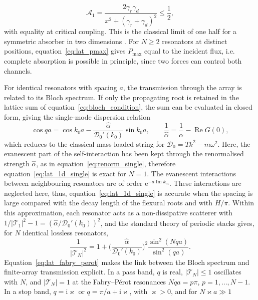 \begin{equation}\label{eq:lat_absorbed_1d}
    \mathcal{A}_1=\frac{2\gamma_r\gamma_d}{x^2+(\gamma_r+\gamma_d)^2}\le\frac12,
\end{equation}
with equality at critical coupling. This is the classical limit of one half for a symmetric absorber in two dimensions \citep{evans1976theory}. For $N\ge2$ resonators at distinct positions, equation~\eqref{eq:lat_pmax} gives $P_{\max}$ equal to the incident flux, i.e. complete absorption is possible in principle, since two forces can control both channels.

For identical resonators with spacing $a$, the transmission through the array is related to its Bloch spectrum. If only the propagating root is retained in the lattice sum of equation~\eqref{eq:bloch_condition}, the sum can be evaluated in closed form, giving the single-mode dispersion relation
\begin{equation}\label{eq:lat_1d_single}
    \cos qa=\cos k_0a-\frac{\widehat{\alpha}}{\mathcal{D}_0'(k_0)}\sin k_0a,
    \qquad
    \frac{1}{\widehat{\alpha}}=\frac{1}{\alpha}-\operatorname{Re}G(0),
\end{equation}
which reduces to the classical mass-loaded string for $\mathcal{D}_0=Tk^2-m\omega^2$. Here, the evanescent part of the self-interaction has been kept through the renormalised strength $\widehat{\alpha}$, as in equation~\eqref{eq:renorm_single}, therefore equation~\eqref{eq:lat_1d_single} is exact for $N=1$. The evanescent interactions between neighbouring resonators are of order $\mathrm{e}^{-a\operatorname{Im}k_m}$. These interactions are neglected here, thus, equation~\eqref{eq:lat_1d_single} is accurate when the spacing is large compared with the decay length of the flexural roots and with $H/\pi$. Within this approximation, each resonator acts as a non-dissipative scatterer with $1/|\mathcal{T}_1|^2-1=(\widehat{\alpha}/\mathcal{D}_0'(k_0))^2$, and the standard theory of periodic stacks gives, for $N$ identical lossless resonators,
\begin{equation}\label{eq:lat_fabry_perot}
    \frac{1}{|\mathcal{T}_N|^2}=1+\Big(\frac{\widehat{\alpha}}{\mathcal{D}_0'(k_0)}\Big)^2\frac{\sin^2(Nqa)}{\sin^2(qa)} .
\end{equation}
Equation~\eqref{eq:lat_fabry_perot} makes the link between the Bloch spectrum and finite-array transmission explicit. In a pass band, $q$ is real, $|\mathcal{T}_N|\le1$ oscillates with $N$, and $|\mathcal{T}_N|=1$ at the Fabry--P\'erot resonances $Nqa=p\pi$, $p=1,\ldots,N-1$. In a stop band, $q=\mathrm{i}\varkappa$ or $q=\pi/a+\mathrm{i}\varkappa$, with $\varkappa>0$, and for $N\varkappa a\gg1$
